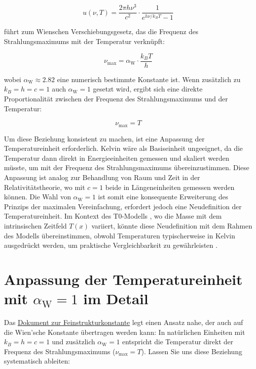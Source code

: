 \documentclass[12pt,a4paper]{article}
\newcommand{\Tfield}{T(x)}
\newcommand{\alphaW}{\alpha_{\text{W}}}
\begin{document}
	\begin{equation}
		u(\nu, T) = \frac{2\pi h \nu^3}{c^2} \cdot \frac{1}{e^{h \nu / k_B T} - 1}
	\end{equation}
	
	führt zum Wienschen Verschiebungsgesetz, das die Frequenz des Strahlungsmaximums mit der Temperatur verknüpft:
	
	\begin{equation}
		\nu_{\text{max}} = \alphaW \cdot \frac{k_B T}{h}
	\end{equation}
	
	wobei \(\alphaW \approx 2.82\) eine numerisch bestimmte Konstante ist. Wenn zusätzlich zu \(k_B = h = c = 1\) auch \(\alphaW = 1\) gesetzt wird, ergibt sich eine direkte Proportionalität zwischen der Frequenz des Strahlungsmaximums und der Temperatur:
	
	\begin{equation}
		\nu_{\text{max}} = T
	\end{equation}
	
	Um diese Beziehung konsistent zu machen, ist eine Anpassung der Temperatureinheit erforderlich. Kelvin wäre als Basiseinheit ungeeignet, da die Temperatur dann direkt in Energieeinheiten gemessen und skaliert werden müsste, um mit der Frequenz des Strahlungsmaximums übereinzustimmen. Diese Anpassung ist analog zur Behandlung von Raum und Zeit in der Relativitätstheorie, wo mit \(c = 1\) beide in Längeneinheiten gemessen werden können. Die Wahl von \(\alphaW = 1\) ist somit eine konsequente Erweiterung des Prinzips der maximalen Vereinfachung, erfordert jedoch eine Neudefinition der Temperatureinheit. Im Kontext des T0-Modells \cite{pascher_galaxies_2025}, wo die Masse mit dem intrinsischen Zeitfeld \(\Tfield\) variiert, könnte diese Neudefinition mit dem Rahmen des Modells übereinstimmen, obwohl Temperaturen typischerweise in Kelvin ausgedrückt werden, um praktische Vergleichbarkeit zu gewährleisten \cite{pascher_messdifferenzen_2025}.
	
	\section{Anpassung der Temperatureinheit mit \(\alphaW = 1\) im Detail}
	
	Das \href{https://github.com/jpascher/T0-Time-Mass-Duality/tree/main/2/pdf/Deutsch/Natürliche Einheiten mit Feinstrukturkonstante alpha = 1_de.pdf}{Dokument zur Feinstrukturkonstante} \cite{pascher_alpha_2025} legt einen Ansatz nahe, der auch auf die Wien'sche Konstante übertragen werden kann: In natürlichen Einheiten mit \(k_B = h = c = 1\) und zusätzlich \(\alphaW = 1\) entspricht die Temperatur direkt der Frequenz des Strahlungsmaximums (\(\nu_{\text{max}} = T\)). Lassen Sie uns diese Beziehung systematisch ableiten:
	
\end{document}
